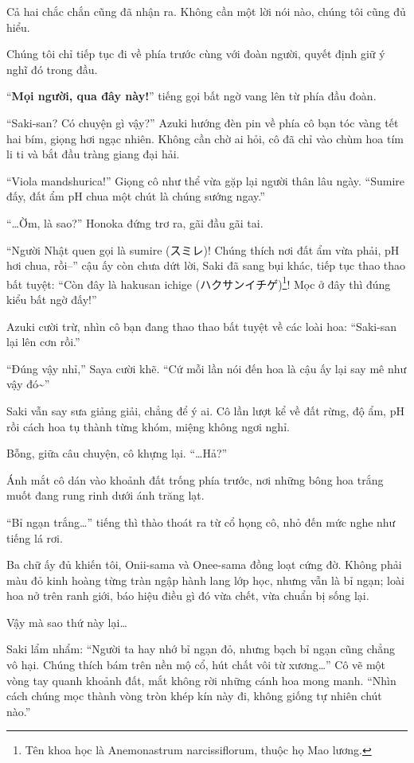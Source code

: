\documentclass[../main.tex]{subfiles}
\begin{document}
Cả hai chắc chắn cũng đã nhận ra. Không cần một lời nói nào, chúng tôi cũng đủ hiểu.

Chúng tôi chỉ tiếp tục đi về phía trước cùng với đoàn người, quyết định giữ ý nghĩ đó trong đầu.

``\textbf{Mọi người, qua đây này!}'' tiếng gọi bất ngờ vang lên từ phía đầu đoàn.

``Saki-san? Có chuyện gì vậy?'' Azuki hướng đèn pin về phía cô bạn tóc vàng tết hai bím, giọng hơi ngạc nhiên. Không cần chờ ai hỏi, cô đã chỉ vào chùm hoa tím li ti và bắt đầu tràng giang đại hải.

``Viola mandshurica!'' Giọng cô như thể vừa gặp lại người thân lâu ngày. ``Sumire đấy, đất ẩm pH chua một chút là chúng sướng ngay.''

``\dots Ờm, là sao?'' Honoka đứng trơ ra, gãi đầu gãi tai.

``Người Nhật quen gọi là sumire (スミレ)! Chúng thích nơi đất ẩm vừa phải, pH hơi chua, rồi--'' cậu ấy còn chưa dứt lời, Saki đã sang bụi khác, tiếp tục thao thao bất tuyệt: ``Còn đây là hakusan ichige (ハクサンイチゲ)\footnote{Tên khoa học là Anemonastrum narcissiflorum, thuộc họ Mao lương.}! Mọc ở đây thì đúng kiểu bất ngờ đấy!''

Azuki cười trừ, nhìn cô bạn đang thao thao bất tuyệt về các loài hoa: ``Saki-san lại lên cơn rồi.''

``Đúng vậy nhỉ,'' Saya cười khẽ. ``Cứ mỗi lần nói đến hoa là cậu ấy lại say mê như vậy đó\~{}''

Saki vẫn say sưa giảng giải, chẳng để ý ai. Cô lần lượt kể về đất rừng, độ ẩm, pH rồi cách hoa tụ thành từng khóm, miệng không ngơi nghỉ.

Bỗng, giữa câu chuyện, cô khựng lại. ``\dots Hả?''

Ánh mắt cô dán vào khoảnh đất trống phía trước, nơi những bông hoa trắng muốt đang rung rinh dưới ánh trăng lạt.

``Bỉ ngạn trắng\dots'' tiếng thì thào thoát ra từ cổ họng cô, nhỏ đến mức nghe như tiếng lá rơi.

Ba chữ ấy đủ khiến tôi, Onii-sama và Onee-sama đồng loạt cứng đờ. Không phải màu đỏ kinh hoàng từng tràn ngập hành lang lớp học, nhưng vẫn là bỉ ngạn; loài hoa nở trên ranh giới, báo hiệu điều gì đó vừa chết, vừa chuẩn bị sống lại.

Vậy mà sao thứ này lại\dots

Saki lẩm nhẩm: ``Người ta hay nhớ bỉ ngạn đỏ, nhưng bạch bỉ ngạn cũng chẳng vô hại. Chúng thích bám trên nền mộ cổ, hút chất vôi từ xương\dots'' Cô vẽ một vòng tay quanh khoảnh đất, mắt không rời những cánh hoa mong manh. ``Nhìn cách chúng mọc thành vòng tròn khép kín này đi, không giống tự nhiên chút nào.''
\end{document}
